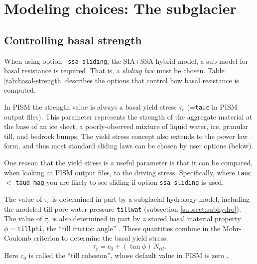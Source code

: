 
\section{Modeling choices:  The subglacier}
\label{sec:modeling-subglacier}


\subsection{Controlling basal strength}  \label{subsect:basestrength}

When using option \texttt{-ssa_sliding}, the SIA+SSA hybrid model, a sub-model for basal resistance is required.  That is, a \emph{sliding law} must be chosen.  Table \ref{tab:basal-strength} describes the options that control how basal resistance is computed.

In PISM the strength value is always a basal yield stress $\tau_c$ (=\texttt{tauc} in PISM output files).  This parameter represents the strength of the aggregate material at the base of an ice sheet, a poorly-observed mixture of liquid water, ice, granular till, and bedrock bumps.  The yield stress concept also extends to the power law form, and thus most standard sliding laws can be chosen by user options (below).

One reason that the yield stress is a useful parameter is that it can be compared, when looking at PISM output files, to the driving stress.  Specifically, where \texttt{tauc} $<$ \texttt{taud_mag} you are likely to see sliding if option \texttt{ssa_sliding} is used.

The value of $\tau_c$ is determined in part by a subglacial hydrology model, including the modeled till-pore water pressure \texttt{tillwat} (subsection \ref{subsect:subhydro}).  The value of $\tau_c$ is also determined in part by a stored basal material property $\phi=$\texttt{tillphi}, the ``till friction angle'' \cite{Paterson}.  These quantities combine in the Mohr-Coulomb criterion \cite[Chapter 8]{Paterson} to determine the basal yield stress:
\begin{equation}
   \tau_c = c_{0} + (\tan\phi)\,N_{til}.  \label{eq:mohrcoulomb}
\end{equation}
Here $c_0$ is called the ``till cohesion'', whose default value in PISM is zero \cite[formula (2.4)]{SchoofStream}.

